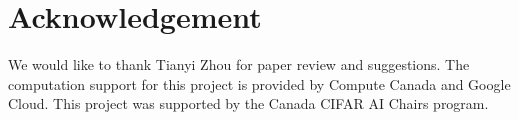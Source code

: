 \documentclass{article}
\begin{document}
\section*{Acknowledgement}
We would like to thank Tianyi Zhou for paper review and suggestions. The computation support for this project is provided by Compute Canada and Google Cloud.
This project was supported by the Canada CIFAR AI Chairs program. 



{

}
\end{document}
